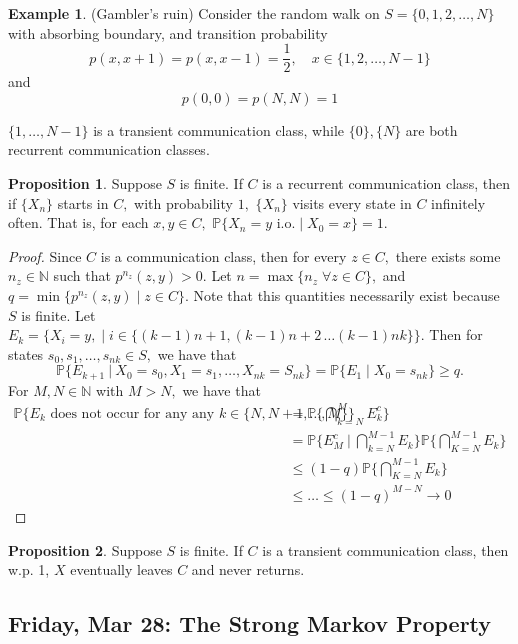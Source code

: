 \documentclass[10pt, oneside]{article}
\newcommand{\bbP}{\mathbb{P}}
\newcommand{\bbN}{\mathbb{N}}
\theoremstyle{definition}
\newtheorem{exmp}{Example}[section]
\newtheorem{prop}{Proposition}
\begin{document}
\begin{exmp} (Gambler's ruin)
    Consider the random walk on $S = \{0,1,2, \dots, N\}$ with absorbing boundary, and transition probability
    \[p(x,x+1) = p(x, x-1) = \frac{1}{2}, \quad x\in \{1,2,\dots, N-1\}\] and 
    \[p(0,0) = p(N,N) = 1\]

    $\{1,\dots, N-1\}$ is a transient communication class, while $\{0\}, \{N\}$ are both recurrent communication classes.
\end{exmp}

\begin{prop}
    Suppose $S$ is finite. If $C$ is a recurrent communication class, then if $\{X_n\}$ starts in $C,$ with probability $1,$ $\{X_n\}$ visits every state in $C$ infinitely often. That is, for each $x,y \in C,$ $\bbP\{X_n = y \text{ i.o.} \; | \; X_0 = x\} = 1.$
\end{prop}
\begin{proof}
    Since $C$ is a communication class, then for every $z \in C,$ there exists some $n_z \in \bbN$ such that $p^{n_z}(z,y) >0.$ Let $n = \max\{n_z\; \forall z \in C\},$ and $q = \min\{p^{n_z}(z,y)\; | \; z\in C\}.$ Note that this quantities necessarily exist because $S$ is finite. Let $E_k = \{X_i = y, \; | \; i \in \{(k-1)n + 1, (k-1)n + 2\, \dots (k-1)nk\}\}.$ Then for states $s_0, s_1, \dots, s_{nk} \in S,$ we have that 
    \[\bbP\{E_{k+1} \: | \: X_0 = s_0, X_1 = s_1, \dots, X_{nk} = S_{nk}\} = \bbP\{E_1 \; | \; X_0 = s_{nk}\} \geq q.\] For $M, N \in \bbN$ with $M > N,$ we have that 
    \begin{align*}
      \bbP\{E_k \text{ does not occur for any any } k \in \{N, N + 1, \dots, M\}\} &= \bbP\{\bigcap_{k=N}^M E_k^c\}  \\
      &= \bbP\{E_M^c \:  | \: \bigcap_{k = N}^{M-1}E_k\}\bbP\{\bigcap_{K=N}^{M-1}E_k\}\\
      &\leq (1-q)\bbP\{\bigcap_{K=N}^{M-1}E_k\} \\
      &\leq\dots\leq (1-q)^{M-N} \to 0
    \end{align*}
\end{proof}
\begin{prop}
    Suppose $S$ is finite. If $C$ is a transient communication class, then w.p. 1, $X$ eventually leaves $C$ and never returns.
\end{prop}

\newpage
\subsection{Friday, Mar 28: The Strong Markov Property}
\end{document}
